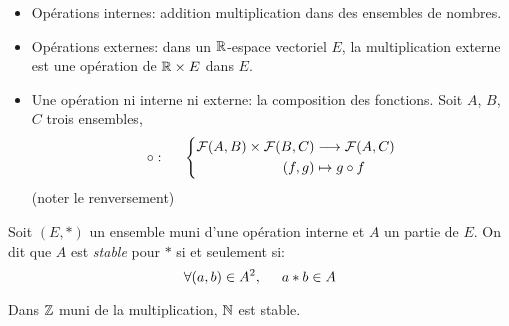 \begin{exples}
\begin{itemize}
  \item Opérations internes: addition multiplication dans des ensembles de nombres.
  \item Opérations externes: dans un $\mathbb{R}$-espace vectoriel $E$, la multiplication externe est une opération de $\mathbb{R}\times E$ dans $E$.
  \item Une opération ni interne ni externe: la composition des fonctions. Soit $A$, $B$, $C$ trois ensembles,
\begin{displaymath}
  \circ : \hspace{0.5cm} 
\left\lbrace 
\begin{aligned}
  \mathcal{F}(A,B)\times\mathcal{F}(B,C) &\longrightarrow \mathcal{F}(A,C)\\
  (f,g) &\mapsto g \circ f
\end{aligned}
\right. 
\end{displaymath}
(noter le renversement)
\end{itemize}
\end{exples}
\begin{defi}
  Soit $(E,*)$ un ensemble muni d'une opération interne et $A$ un partie de $E$. On dit que $A$ est \emph{stable} pour $*$ si et seulement si:
\begin{displaymath}
  \forall (a,b)\in A^2,\hspace{0.5cm} a*b \in A
\end{displaymath}
\end{defi}
\begin{exple}
  Dans $\mathbb{Z}$ muni de la multiplication, $\mathbb{N}$ est stable.
\end{exple}

